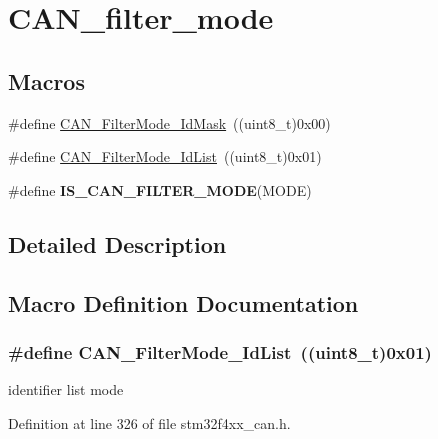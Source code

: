 \hypertarget{group___c_a_n__filter__mode}{\section{C\-A\-N\-\_\-filter\-\_\-mode}
\label{group___c_a_n__filter__mode}
}
\subsection*{Macros}
\begin{DoxyCompactItemize}
\item 
\#define \hyperlink{group___c_a_n__filter__mode_ga8136e518fb31fd91079e4c7c4c19c94b}{C\-A\-N\-\_\-\-Filter\-Mode\-\_\-\-Id\-Mask}~((uint8\-\_\-t)0x00)
\item 
\#define \hyperlink{group___c_a_n__filter__mode_ga91e9144f71b15ac345ee89314711c158}{C\-A\-N\-\_\-\-Filter\-Mode\-\_\-\-Id\-List}~((uint8\-\_\-t)0x01)
\item 
\#define {\bfseries I\-S\-\_\-\-C\-A\-N\-\_\-\-F\-I\-L\-T\-E\-R\-\_\-\-M\-O\-D\-E}(M\-O\-D\-E)
\end{DoxyCompactItemize}


\subsection{Detailed Description}


\subsection{Macro Definition Documentation}
\hypertarget{group___c_a_n__filter__mode_ga91e9144f71b15ac345ee89314711c158}{
\subsubsection[{C\-A\-N\-\_\-\-Filter\-Mode\-\_\-\-Id\-List}]{\setlength{\rightskip}{0pt plus 5cm}\#define C\-A\-N\-\_\-\-Filter\-Mode\-\_\-\-Id\-List~((uint8\-\_\-t)0x01)}}\label{group___c_a_n__filter__mode_ga91e9144f71b15ac345ee89314711c158}
identifier list mode 

Definition at line 326 of file stm32f4xx\-\_\-can.\-h.

